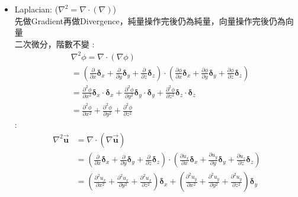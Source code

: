 \documentclass[../main.tex]{subfiles}
\begin{document}
\begin{itemize}
\begin{itemize}
\begin{align}
        \right) \bm \delta_y + \left(
          \frac{\partial \tau_{xz}}{\partial x} + \frac{\partial \tau_{yz}}{\partial y} + \frac{\partial \tau_{zz}}{\partial z}
        \right) \bm \delta_z
      \end{align}
      \item Laplacian: ($\nabla^2 = \nabla \cdot (\nabla)$)\\
      先做Gradient再做Divergence，純量操作完後仍為純量，向量操作完後仍為向量\\
      二次微分，階數不變
      :
      \begin{align}
        &\nabla^2\phi = \nabla \cdot (\nabla \phi) \nonumber \\
        &= \left(
          \frac{\partial }{\partial x}\bm \delta_x + \frac{\partial }{\partial y}\bm \delta_y + \frac{\partial }{\partial z}\bm \delta_z
        \right) \cdot \left(
          \frac{\partial \phi}{\partial x}\bm \delta_x + \frac{\partial \phi}{\partial y}\bm \delta_y + \frac{\partial \phi}{\partial z}\bm \delta_z
        \right) \nonumber \\
        &= \frac{\partial^2 \phi}{\partial x^2}\bm \delta_x \cdot \bm \delta_x 
        + \frac{\partial^2 \phi}{\partial y^2}\bm \delta_y \cdot \bm \delta_y
        + \frac{\partial^2 \phi}{\partial z^2}\bm \delta_z \cdot \bm \delta_z \nonumber \\
        &= \frac{\partial^2 \phi}{\partial x^2} + \frac{\partial^2 \phi}{\partial y^2} + \frac{\partial^2 \phi}{\partial z^2}
      \end{align}
      :
      \begin{align}
        \nabla^2 \vec {\bm u} &= \nabla \cdot (\nabla \vec {\bm u}) \nonumber \\
        &= \left(
          \frac{\partial }{\partial x}\bm \delta_x + \frac{\partial }{\partial y}\bm \delta_y + \frac{\partial }{\partial z}\bm \delta_z
        \right) \cdot \left(
          \frac{\partial u_x}{\partial x}\bm \delta_x + \frac{\partial u_y}{\partial y}\bm \delta_y + \frac{\partial u_z}{\partial z}\bm \delta_z
        \right) \nonumber \\
        &= \left(
          \frac{\partial^2 u_x}{\partial x^2} + \frac{\partial^2 u_x}{\partial y^2} + \frac{\partial^2 u_x}{\partial z^2}
        \right) \bm \delta_x + \left(
          \frac{\partial^2 u_y}{\partial x^2} + \frac{\partial^2 u_y}{\partial y^2} + \frac{\partial^2 u_y}{\partial z^2}
        \right) \bm \delta_y \nonumber \\

\end{align}
\end{itemize}
\end{itemize}
\end{document}

